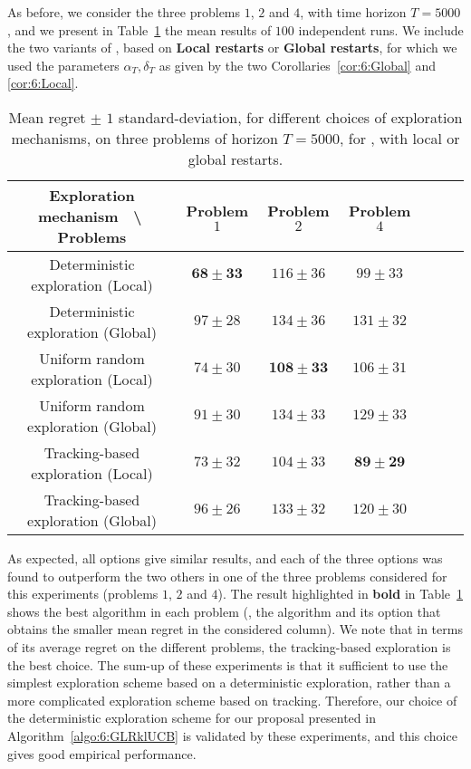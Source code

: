 As before, we consider the three problems $1$, $2$ and $4$, with time horizon $T=5000$,
and we present in Table~\ref{table:6:exploringDifferentForcedExplorationMechanisms} the mean results of $100$ independent runs.
We include the two variants of \GLRklUCB, based on \textbf{Local restarts} or \textbf{Global restarts}, for which we used the parameters $\alpha_T,\delta_T$ as given by the two Corollaries~\ref{cor:6:Global} and \ref{cor:6:Local}.

\begin{small} %
\begin{table}[ht]
    \begin{small} %
    \centering
    \begin{tabular}{c|cccccc}
        \textbf{Exploration mechanism} $\;$ \textbackslash $\;$ \textbf{Problems} & Problem $1$ & Problem $2$ & Problem $4$ \\
        \hline
        Deterministic exploration (Local)   & $\mathbf{68 \pm 33}$ & $116 \pm 36$ & $99 \pm 33$ \\
        Deterministic exploration (Global)  & $97 \pm 28$ & $134 \pm 36$ & $131 \pm 32$ \\
        \hline
        Uniform random exploration (Local)  & $74 \pm 30$ & $\mathbf{108 \pm 33}$ & $106 \pm 31$ \\
        Uniform random exploration (Global) & $91 \pm 30$ & $134 \pm 33$ & $129 \pm 33$ \\
        \hline
        Tracking-based exploration (Local)  & $73 \pm 32$ & $104 \pm 33$ & $\mathbf{89 \pm 29}$ \\
        Tracking-based exploration (Global) & $96 \pm 26$ & $133 \pm 32$ & $120 \pm 30$
    \end{tabular}
    \caption{Mean regret $\pm$ $1$ standard-deviation, for different choices of exploration mechanisms, on three problems of horizon $T=5000$, for \GLRklUCB, with local or global restarts.}
    \label{table:6:exploringDifferentForcedExplorationMechanisms}
    \end{small} %
\end{table}
\end{small} %

As expected, all options give similar results, and each of the three options was found to outperform the two others in one of the three problems considered for this experiments (problems $1$, $2$ and $4$).
The result highlighted in \textbf{bold} in Table~\ref{table:6:exploringDifferentForcedExplorationMechanisms} shows the best algorithm in each problem (\ie, the algorithm and its option that obtains the smaller mean regret in the considered column).
We note that in terms of its average regret on the different problems, the tracking-based exploration is the best choice.
%
The sum-up of these experiments is that it sufficient to use the simplest exploration scheme based on a deterministic exploration,
rather than a more complicated exploration scheme based on tracking.
Therefore, our choice of the deterministic exploration scheme for our proposal \GLRklUCB{} presented in Algorithm~\ref{algo:6:GLRklUCB} is validated by these experiments, and this choice gives good empirical performance.

